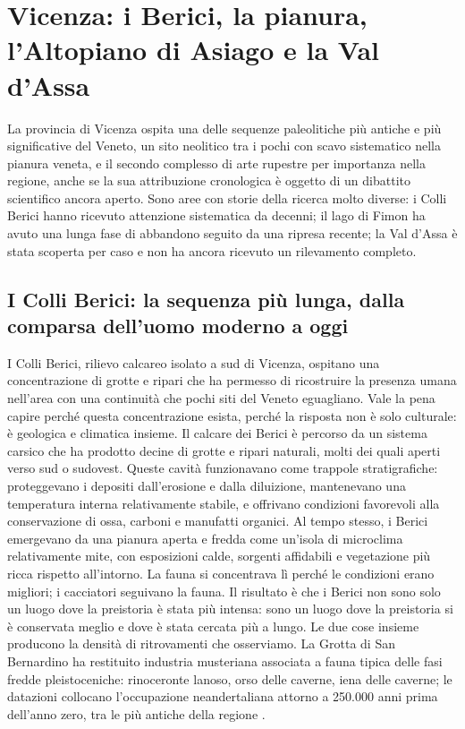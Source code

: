 \section{Vicenza: i Berici, la pianura, l'Altopiano di Asiago e la Val d'Assa}

La provincia di Vicenza ospita una delle sequenze paleolitiche più antiche e più significative del Veneto, un sito neolitico tra i pochi con scavo sistematico nella pianura veneta, e il secondo complesso di arte rupestre per importanza nella regione, anche se la sua attribuzione cronologica è oggetto di un dibattito scientifico ancora aperto. Sono aree con storie della ricerca molto diverse: i Colli Berici hanno ricevuto attenzione sistematica da decenni; il lago di Fimon ha avuto una lunga fase di abbandono seguito da una ripresa recente; la Val d'Assa è stata scoperta per caso e non ha ancora ricevuto un rilevamento completo.

\subsection{I Colli Berici: la sequenza più lunga, dalla comparsa dell'uomo moderno a oggi}

I Colli Berici, rilievo calcareo isolato a sud di Vicenza, ospitano una concentrazione di grotte e ripari che ha permesso di ricostruire la presenza umana nell'area con una continuità che pochi siti del Veneto eguagliano. Vale la pena capire perché questa concentrazione esista, perché la risposta non è solo culturale: è geologica e climatica insieme. Il calcare dei Berici è percorso da un sistema carsico che ha prodotto decine di grotte e ripari naturali, molti dei quali aperti verso sud o sudovest. Queste cavità funzionavano come trappole stratigrafiche: proteggevano i depositi dall'erosione e dalla diluizione, mantenevano una temperatura interna relativamente stabile, e offrivano condizioni favorevoli alla conservazione di ossa, carboni e manufatti organici. Al tempo stesso, i Berici emergevano da una pianura aperta e fredda come un'isola di microclima relativamente mite, con esposizioni calde, sorgenti affidabili e vegetazione più ricca rispetto all'intorno. La fauna si concentrava lì perché le condizioni erano migliori; i cacciatori seguivano la fauna. Il risultato è che i Berici non sono solo un luogo dove la preistoria è stata più intensa: sono un luogo dove la preistoria si è conservata meglio e dove è stata cercata più a lungo. Le due cose insieme producono la densità di ritrovamenti che osserviamo. La Grotta di San Bernardino ha restituito industria musteriana associata a fauna tipica delle fasi fredde pleistoceniche: rinoceronte lanoso, orso delle caverne, iena delle caverne; le datazioni collocano l'occupazione neandertaliana attorno a 250.000 anni prima dell'anno zero, tra le più antiche della regione \citep{bartolomei1980}.

